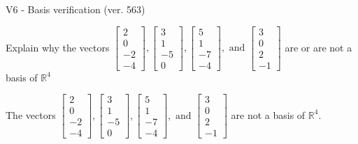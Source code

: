 \begin{exercise}
  \begin{exerciseTitle}V6 - Basis verification (ver. 563)\end{exerciseTitle}
  \begin{exerciseStatement}
    Explain why the vectors \(\left[\begin{array}{r}
2 \\
0 \\
-2 \\
-4
\end{array}\right] , \left[\begin{array}{r}
3 \\
1 \\
-5 \\
0
\end{array}\right] , \left[\begin{array}{r}
5 \\
1 \\
-7 \\
-4
\end{array}\right] , \text{ and } \left[\begin{array}{r}
3 \\
0 \\
2 \\
-1
\end{array}\right]\) are or are not a basis of \(\mathbb{R}^4\)	


  \end{exerciseStatement}
  \begin{exerciseAnswer}
   The vectors \(\left[\begin{array}{r}
2 \\
0 \\
-2 \\
-4
\end{array}\right] , \left[\begin{array}{r}
3 \\
1 \\
-5 \\
0
\end{array}\right] , \left[\begin{array}{r}
5 \\
1 \\
-7 \\
-4
\end{array}\right] , \text{ and } \left[\begin{array}{r}
3 \\
0 \\
2 \\
-1
\end{array}\right]\) 
  	 are not  a basis of \(\mathbb{R}^4\).
  


  \end{exerciseAnswer}
\end{exercise}